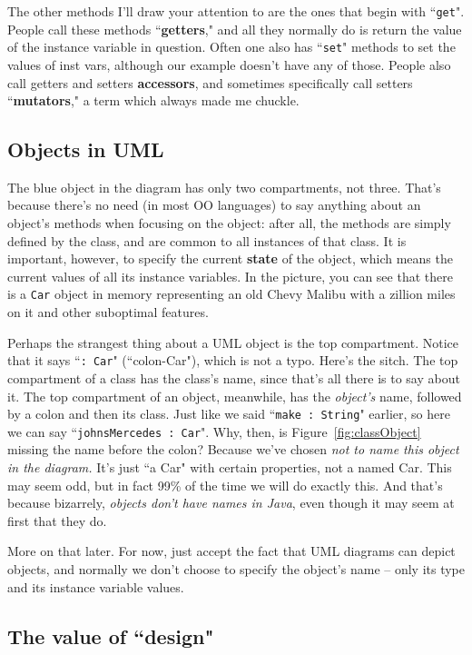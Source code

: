 The other methods I'll draw your attention to are the ones that begin with
``\texttt{get}". People call these methods ``\textbf{getters}," and all they
normally do is return the value of the instance variable in question. Often
one also has ``\texttt{set}" methods to set the values of inst vars, although
our example doesn't have any of those. People also call getters and setters
\textbf{accessors}, and sometimes specifically call setters
``\textbf{mutators}," a term which always made me chuckle.

\subsection{Objects in UML}

The blue object in the diagram has only two compartments, not three. That's
because there's no need (in most OO languages) to say anything about an
object's methods when focusing on the object: after all, the methods are
simply defined by the class, and are common to all instances of that class. It
is important, however, to specify the current \textbf{state} of the object,
which means the current values of all its instance variables. In the picture,
you can see that there is a \texttt{Car} object in memory representing an old
Chevy Malibu with a zillion miles on it and other suboptimal features.

Perhaps the strangest thing about a UML object is the top compartment. Notice
that it says ``\texttt{:~Car}" (``colon-Car"), which is not a typo. Here's the
sitch. The top compartment of a class has the class's name, since that's all
there is to say about it. The top compartment of an object, meanwhile, has the
\textit{object's} name, followed by a colon and then its class. Just like we
said ``\texttt{make :~String}" earlier, so here we can say
``\texttt{johnsMercedes :~Car}". Why, then, is Figure~\ref{fig:classObject}
missing the name before the colon? Because we've chosen \textit{not to name
this object in the diagram.} It's just ``a Car" with certain properties, not a
named Car. This may seem odd, but in fact 99\% of the time we will do exactly
this. And that's because bizarrely, \textit{objects don't have names in Java},
even though it may seem at first that they do.

More on that later. For now, just accept the fact that UML diagrams can depict
objects, and normally we don't choose to specify the object's name -- only its
type and its instance variable values.


\subsection{The value of ``design"}

